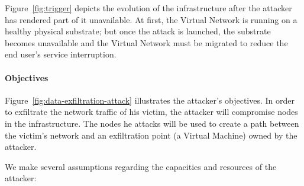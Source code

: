 \label{sec:attack_model}

Figure~\ref{fig:trigger} depicts the evolution of the infrastructure after the attacker has rendered part of it unavailable. 
At first, the Virtual Network is running on a healthy physical substrate; but once the attack is launched, the substrate becomes unavailable and the Virtual Network must be migrated to reduce the end user's service interruption.

\paragraph{Objectives}
Figure~\ref{fig:data-exfiltration-attack} illustrates the attacker's objectives.
In order to exfiltrate the network traffic of his victim, the attacker will compromise nodes in the infrastructure. The nodes he attacks will be used to create a path between the victim's network and an exfiltration point (\eg a Virtual Machine) owned by the attacker.

We make several assumptions regarding the capacities and resources of the attacker:
